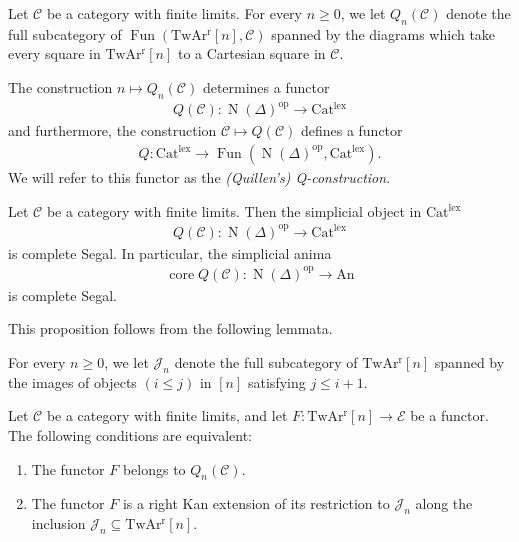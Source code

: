 \documentclass[a4paper,dvipdfmx,11pt,reqno]{amsart}
\DeclareMathOperator{\myop}{op}
\DeclareMathOperator{\N}{N}
\DeclareMathOperator{\Fun}{Fun}
\DeclareMathOperator{\core}{core}
\newcommand{\C}{\mathcal{C}}
\newcommand{\E}{\mathcal{E}}
\newcommand{\J}{\mathcal{J}}
\newcommand{\An}{\mathrm{An}}
\newcommand{\Catlex}{\mathrm{Cat^{lex}}}
\newcommand{\TwArr}{\mathrm{TwAr^{r}}}
\begin{document}
\begin{definition}
  Let $\C$ be a category with finite limits.
  For every $n \geq 0$, we let $Q_{n}(\C)$ denote the full subcategory of $\Fun(\TwArr[n],\C)$ spanned by the diagrams which take every square in $\TwArr[n]$ to a Cartesian square in $\C$.

  The construction $n \mapsto Q_{n}(\C)$ determines a functor 
  \begin{align*}
    Q(\C) : \N(\Delta)^{\myop} \to \Catlex
  \end{align*}
  and furthermore, the construction $\C \mapsto Q(\C)$ defines a functor 
  \begin{align*}
    Q : \Catlex \to \Fun(\N(\Delta)^{\myop},\Catlex).
  \end{align*}
  We will refer to this functor as the \textit{(Quillen's) Q-construction}.
\end{definition}

\begin{proposition}
  Let $\C$ be a category with finite limits.
  Then the simplicial object in $\Catlex$
  \begin{align*}
    Q(\C) : \N(\Delta)^{\myop} \to \Catlex
  \end{align*}
  is complete Segal.
  In particular, the simplicial anima 
  \begin{align*}
    \core Q(\C) : \N(\Delta)^{\myop} \to \An
  \end{align*}
  is complete Segal.
\end{proposition}

This proposition follows from the following lemmata.

\begin{notation}
  For every $n \geq 0$, we let $\J_n$ denote the full subcategory of $\TwArr[n]$ spanned by the images of objects $(i \leq j)$ in $[n]$ satisfying $j \leq i+1$.
\end{notation}

\begin{lemma}
  Let $\C$ be a category with finite limits, and let $F : \TwArr[n] \to \E$ be a functor.
  The following conditions are equivalent:
  \begin{enumerate}
    \item The functor $F$ belongs to $Q_n(\C)$.
    \item The functor $F$ is a right Kan extension of its restriction to $\J_n$ along the inclusion $\J_n \subseteq \TwArr[n]$.
  \end{enumerate}
\end{lemma}
\end{document}
